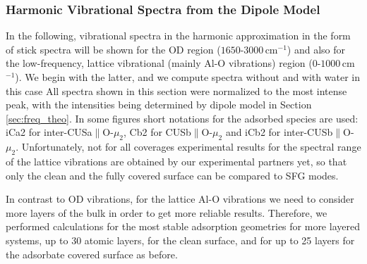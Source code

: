 \documentclass[11pt,DIV=13,BCOR=5mm,a4paper,headinclude]{scrbook}
\newcommand\todo[1]{\textcolor{red}{TODO: \textit{{#1}}}}
\begin{document}
\subsubsection{Harmonic Vibrational Spectra from the Dipole Model}\label{phonons}

In the following, vibrational spectra in the harmonic approximation in the form of stick spectra will be shown for the OD region ($1650$-$3000\,$cm$^{-1}$) and also for the low-frequency, lattice vibrational (mainly Al-O vibrations) region ($0$-$1000\,$cm$^{-1}$).
We begin with the latter, and we compute spectra without and with water in this case
All spectra shown in this section were normalized to the most intense peak, with the intensities being determined by dipole model in Section \ref{sec:freq_theo}.
In some figures short notations for the adsorbed species are used: iCa2 for inter-CUSa$\parallel$O-$\mu_2$, Cb2 for CUSb$\parallel$O-$\mu_2$ and iCb2 for inter-CUSb$\parallel$O-$\mu_2$.
Unfortunately, not for all coverages experimental results for the spectral range of the lattice vibrations are obtained by our experimental partners yet, so that only the clean and the fully covered surface can be compared to SFG modes.


In contrast to OD vibrations, for the lattice Al-O vibrations we need to consider more layers of the bulk in order to get more reliable results.
Therefore, we performed calculations for the most stable adsorption geometries for more layered systems, up to $30$ atomic layers, for the clean surface, and for up to 25 layers for the adsorbate covered surface as before.
\end{document}
